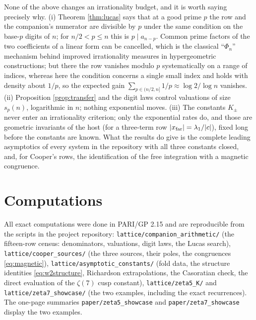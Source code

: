 \documentclass[11pt]{amsart}
\theoremstyle{definition}
\theoremstyle{remark}
\begin{document}
None of the above changes an irrationality budget, and it is worth saying precisely why. (i) Theorem \ref{thm:lucas} says that at a good prime $p$ the row and the companion's numerator are divisible by $p$ under the same condition on the base-$p$ digits of $n$; for $n/2<p\le n$ this is $p\mid a_{n-p}$. Common prime factors of the two coefficients of a linear form can be cancelled, which is the classical ``$\Phi_n$'' mechanism behind improved irrationality measures in hypergeometric constructions; but there the row vanishes modulo $p$ systematically on a range of indices, whereas here the condition concerns a single small index and holds with density about $1/p$, so the expected gain $\sum_{p\in(n/2,n]}1/p\approx\log2/\log n$ vanishes. (ii) Proposition \ref{prop:transfer} and the digit laws control valuations of size $s_p(n)$, logarithmic in $n$; nothing exponential moves. (iii) The constants $K_\pm$ never enter an irrationality criterion; only the exponential rates do, and those are geometric invariants of the host (for a three-term row $|x_{\rm far}|=\lambda_1/|c|$), fixed long before the constants are known. What the results do give is the complete leading asymptotics of every system in the repository with all three constants closed, and, for Cooper's rows, the identification of the free integration with a magnetic congruence.

\section{Computations}\label{sec:comp}
All exact computations were done in PARI/GP 2.15 and are reproducible from the scripts in the project repository: \texttt{lattice/companion\_arithmetic/} (the fifteen-row census: denominators, valuations, digit laws, the Lucas search), \texttt{lattice/cooper\_sources/} (the three sources, their poles, the congruences \eqref{eq:magnetic}), \texttt{lattice/asymptotic\_constants/} (fold data, the structure identities \eqref{eq:w2structure}, Richardson extrapolations, the Casoratian check, the direct evaluation of the $\zeta(7)$ cusp constant), \texttt{lattice/zeta5\_K/} and \texttt{lattice/zeta7\_showcase/} (the two examples, including the exact recurrences). The one-page summaries \texttt{paper/zeta5\_showcase} and \texttt{paper/zeta7\_showcase} display the two examples.
\end{document}
